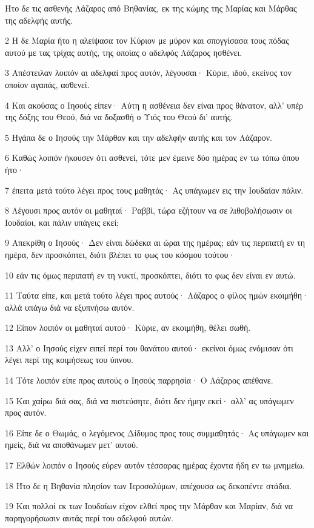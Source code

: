\par Ήτο δε τις ασθενής Λάζαρος από Βηθανίας, εκ της κώμης της Μαρίας και Μάρθας της αδελφής αυτής.
\par 2 Η δε Μαρία ήτο η αλείψασα τον Κύριον με μύρον και σπογγίσασα τους πόδας αυτού με τας τρίχας αυτής, της οποίας ο αδελφός Λάζαρος ησθένει.
\par 3 Απέστειλαν λοιπόν αι αδελφαί προς αυτόν, λέγουσαι· Κύριε, ιδού, εκείνος τον οποίον αγαπάς, ασθενεί.
\par 4 Και ακούσας ο Ιησούς είπεν· Αύτη η ασθένεια δεν είναι προς θάνατον, αλλ' υπέρ της δόξης του Θεού, διά να δοξασθή ο Υιός του Θεού δι' αυτής.
\par 5 Ηγάπα δε ο Ιησούς την Μάρθαν και την αδελφήν αυτής και τον Λάζαρον.
\par 6 Καθώς λοιπόν ήκουσεν ότι ασθενεί, τότε μεν έμεινε δύο ημέρας εν τω τόπω όπου ήτο·
\par 7 έπειτα μετά τούτο λέγει προς τους μαθητάς· Ας υπάγωμεν εις την Ιουδαίαν πάλιν.
\par 8 Λέγουσι προς αυτόν οι μαθηταί· Ραββί, τώρα εζήτουν να σε λιθοβολήσωσιν οι Ιουδαίοι, και πάλιν υπάγεις εκεί;
\par 9 Απεκρίθη ο Ιησούς· Δεν είναι δώδεκα αι ώραι της ημέρας; εάν τις περιπατή εν τη ημέρα, δεν προσκόπτει, διότι βλέπει το φως του κόσμου τούτου·
\par 10 εάν τις όμως περιπατή εν τη νυκτί, προσκόπτει, διότι το φως δεν είναι εν αυτώ.
\par 11 Ταύτα είπε, και μετά τούτο λέγει προς αυτούς· Λάζαρος ο φίλος ημών εκοιμήθη· αλλά υπάγω διά να εξυπνήσω αυτόν.
\par 12 Είπον λοιπόν οι μαθηταί αυτού· Κύριε, αν εκοιμήθη, θέλει σωθή.
\par 13 Αλλ' ο Ιησούς είχεν ειπεί περί του θανάτου αυτού· εκείνοι όμως ενόμισαν ότι λέγει περί της κοιμήσεως του ύπνου.
\par 14 Τότε λοιπόν είπε προς αυτούς ο Ιησούς παρρησία· Ο Λάζαρος απέθανε.
\par 15 Και χαίρω διά σας, διά να πιστεύσητε, διότι δεν ήμην εκεί· αλλ' ας υπάγωμεν προς αυτόν.
\par 16 Είπε δε ο Θωμάς, ο λεγόμενος Δίδυμος προς τους συμμαθητάς· Ας υπάγωμεν και ημείς, διά να αποθάνωμεν μετ' αυτού.
\par 17 Ελθών λοιπόν ο Ιησούς εύρεν αυτόν τέσσαρας ημέρας έχοντα ήδη εν τω μνημείω.
\par 18 Ήτο δε η Βηθανία πλησίον των Ιεροσολύμων, απέχουσα ως δεκαπέντε στάδια.
\par 19 Και πολλοί εκ των Ιουδαίων είχον ελθεί προς την Μάρθαν και Μαρίαν, διά να παρηγορήσωσιν αυτάς περί του αδελφού αυτών.
